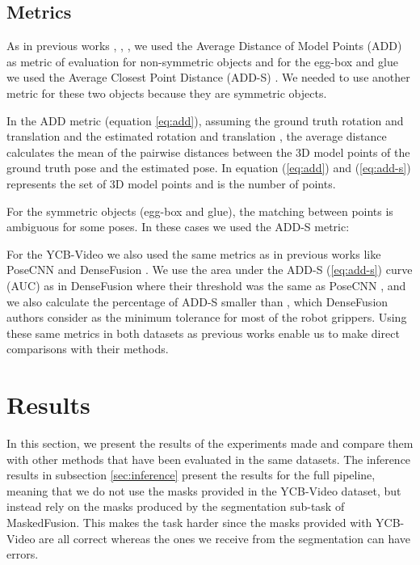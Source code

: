 \documentclass[runningheads]{llncs}
\begin{document}
\subsection{Metrics}
As in previous works \cite{ssd6d}, \cite{pvnet}, \cite{densefusion}, \cite{posecnn} we used the Average Distance of Model Points (ADD) \cite{linemod} as metric of evaluation for non-symmetric objects and for the egg-box and glue we used the Average Closest Point Distance (ADD-S) \cite{posecnn}.
We needed to use another metric for these two objects because they are symmetric objects.
\vspace{-0.2em}


In the ADD metric (equation \ref{eq:add}), assuming the ground truth rotation  and translation  and the estimated rotation  and translation , the average distance calculates the mean of the pairwise distances between the 3D model points of the ground truth pose and the estimated pose. In equation (\ref{eq:add}) and (\ref{eq:add-s})  represents the set of 3D model points and  is the number of points.

For the symmetric objects (egg-box and glue), the matching between points is ambiguous for some poses. In these cases we used the ADD-S metric:
\vspace{-0.2em}


For the YCB-Video we also used the same metrics as in previous works like PoseCNN \cite{posecnn} and DenseFusion \cite{densefusion}.
We use the area under the ADD-S (\ref{eq:add-s}) curve (AUC) as in DenseFusion \cite{densefusion} where their threshold was  the same as PoseCNN \cite{posecnn}, and we also calculate the percentage of ADD-S smaller than , which DenseFusion \cite{densefusion} authors consider as the minimum tolerance for most of the robot grippers.
Using these same metrics in both datasets as previous works enable us to make direct comparisons with their methods.

\section{Results}
\label{sec:results}
In this section, we present the results of the experiments made and compare them with other methods that have been evaluated in the same datasets.
The inference results in subsection \ref{sec:inference} present the results for the full pipeline, meaning that we do not use the masks provided in the YCB-Video dataset, but instead rely on the masks produced by the segmentation sub-task of MaskedFusion.
This makes the task harder since the masks provided with YCB-Video are all correct whereas the ones we receive from the segmentation can have errors.
\end{document}
